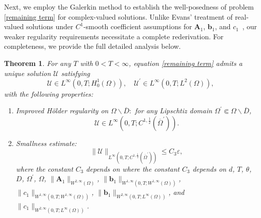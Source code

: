 \documentclass[11pt,reqno,oneside]{amsart}
\numberwithin{equation}{section}
\newtheorem{theorem}{Theorem}[section]
\theoremstyle{definition}
\theoremstyle{remark}
\numberwithin{equation}{section}
\begin{document}
	Next, we employ the Galerkin method to establish the well-posedness of problem \eqref{remaining term} for {complex-valued solutions}. Unlike Evans' treatment of {real-valued solutions} under {$C^1$-smooth coefficient assumptions} for $\mathbf{A}_1$, $\mathbf{b}_1$, and $c_1$~\cite{Evans}, our weaker regularity requirements necessitate a complete rederivation. For completeness, we provide the full detailed analysis below.
	\begin{theorem}\label{3.1}
		For any $T$ with $0<T<\infty$, equation \eqref{remaining term} admits a unique solution $\mathcal{U}$ satisfying
		$$ 	\mathcal{U}\in L^{\infty}\left(0,T;H^{1}_{0}(\Omega)\right),\quad  \mathcal{U}^\prime \in L^{\infty}\left(0,T;L^{2}(\Omega)\right) ,$$ 
		with the following properties:
		\begin{enumerate}
			\item Improved H\"older regularity on $\Omega\backslash \overline{D}:$ for any  Lipschtiz domain $\Omega^\prime \Subset \Omega\backslash \overline{D}$,
			\begin{equation*}
				\mathcal{U} \in L^{\infty}(0,T;C^{1,\frac{1}{2}}(\overline{\Omega}^{\prime})). 
			\end{equation*} 
			\item  Smallness estimate:
			\begin{equation*}
				\|\mathcal{U}\|_{L^{\infty}(0,T;C^{1,\frac{1}{2}}(\overline{\Omega}^{\prime})) }\leqslant C_3 \varepsilon ,
			\end{equation*}
			where the constant $C_3$ depends on where the constant $C_3$ depends on $d$, $T$, $\theta$, $D$, $\Omega^\prime$, $\Omega$, $\|\mathbf{A}_1\|_{W^{2,\infty}(\Omega)}$, $\|\mathbf{b}_1\|_{W^{1,\infty}(0,T; W^{1,\infty}(\Omega))}$, $\|c_1\|_{W^{1,\infty}(0,T; W^{1,\infty}(\Omega))}$, $\|\mathbf{b}_1\|_{W^{2,\infty}(0,T; L^{\infty}(\Omega))}$, and $\|c_1\|_{W^{2,\infty}(0,T; L^{\infty}(\Omega))}$.
			
		\end{enumerate}
	\end{theorem}
	
\end{document}
